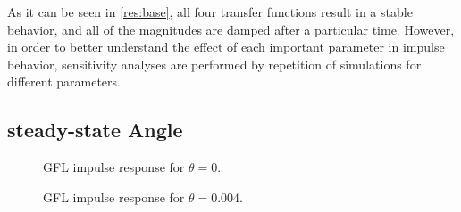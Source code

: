 As it can be seen in \ref{res:base}, all four transfer functions result in a stable behavior, and all of the magnitudes are damped after a particular time. However, in order to better understand the effect of each important parameter in impulse behavior, sensitivity analyses are performed by repetition of simulations for different parameters. 

\subsection{steady-state Angle}



\begin{figure}[ht]
\begin{center}
    \centering
   \nonindent
	\caption[GFL impulse response for $\theta=0$]{GFL impulse response for $\theta=0$.}
	\label{res:theta0}
	\end{center}
\end{figure}
\begin{figure}[ht]
\begin{center}
    \centering
   \nonindent
	\caption[GFL impulse response for $\theta=0.004$]{GFL impulse response for $\theta=0.004$.}
	\label{res:theta0.004}
	\end{center}
\end{figure}


